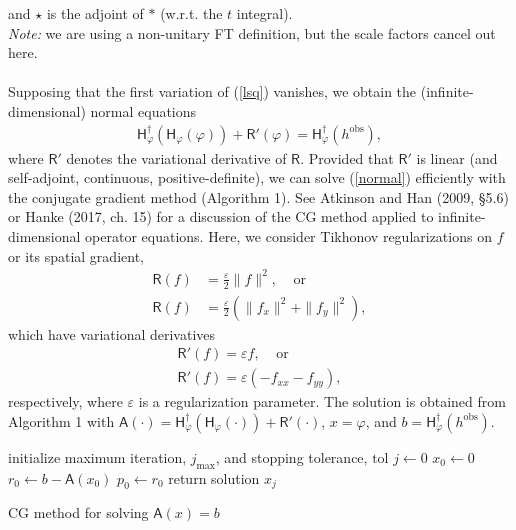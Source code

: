 \documentclass[paper=a4, fontsize=11pt]{article}
\begin{document}
and $\star$ is the adjoint of $*$ (w.r.t. the $t$ integral).
\\
{\footnotesize{\noindent
\emph{Note:} we are using a non-unitary FT definition, but the scale factors
cancel out here.}} \\ \\
Supposing that the first variation of (\ref{lsq}) vanishes, we obtain the
(infinite-dimensional) normal equations
\begin{align}
\mathsf{H}_\varphi^\dagger (\mathsf{H}_\varphi(\varphi)) + \mathsf{R}'(\varphi) = \mathsf{H}_\varphi^\dagger (h^{\mathrm{obs}}), \label{normal}
\end{align}
where $\mathsf{R}'$ denotes the variational derivative of $\mathsf{R}$.
Provided that $\mathsf{R}'$ is linear (and self-adjoint, continuous, positive-definite),
we can solve (\ref{normal})
efficiently with the conjugate gradient method (Algorithm 1).
See Atkinson and Han (2009, \S 5.6) or Hanke (2017, ch. 15) for a discussion
of the CG method applied to infinite-dimensional operator equations.
Here, we consider Tikhonov regularizations on $f$ or its spatial gradient,
\begin{align}
\mathsf{R}(f)&=\frac{\varepsilon}{2}\|f\|^2,\;\;\;\; \text{or}\\
\mathsf{R}(f)&=\frac{\varepsilon}{2}(\|f_x\|^2+\|f_y\|^2),
\end{align}
which have variational derivatives
\begin{align}
\mathsf{R}'(f) = \varepsilon f, \;\;\;\; \text{or} \\
\mathsf{R}'(f) = \varepsilon (-f_{xx}-f_{yy}),
\end{align}
respectively, where $\varepsilon$ is a regularization parameter.
The solution is obtained from Algorithm 1 with $\mathsf{A}(\cdot) = \mathsf{H}_\varphi^\dagger(\mathsf{H}_\varphi(\cdot)) + \mathsf{R}'(\cdot) $, $x=\varphi$, and $b=\mathsf{H}_\varphi^\dagger (h^{\mathrm{obs}})$.

\begin{algorithm}[H]
\SetAlgoLined
initialize maximum iteration, $j_\mathrm{max}$, and stopping tolerance, $\mathrm{tol}$\;
 $j \gets 0$\;
 $x_0 \gets 0$\;
 ${r_0} \gets b - \mathsf{A}(x_0)$\;
 $p_0 \gets r_0$\;
 return solution $x_j$\;
 \caption{CG method for solving $\mathsf{A}(x)=b$ }
\end{algorithm}
\end{document}
